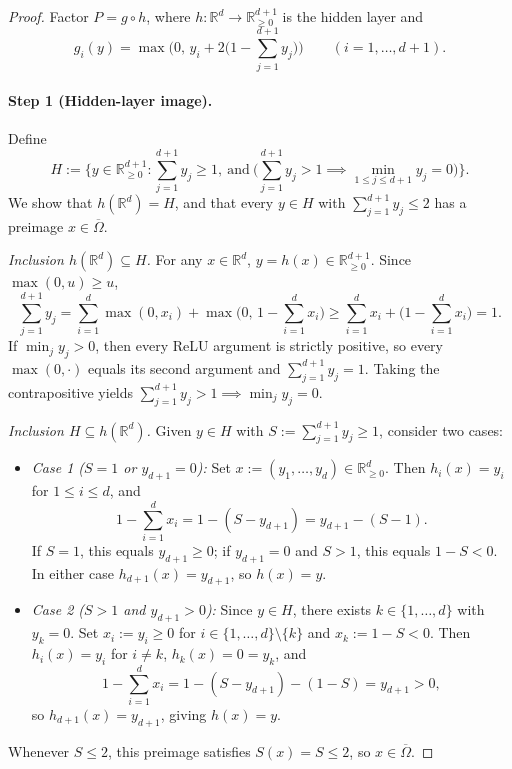 \documentclass[11pt]{article}
\theoremstyle{plain}
\theoremstyle{definition}
\theoremstyle{remark}
\begin{document}
\begin{proof}
Factor $P = g \circ h$, where $h : \mathbb{R}^d \to \mathbb{R}_{\ge 0}^{d+1}$ is the hidden layer and
\[
g_i(y) = \max\biggl(0,\, y_i + 2\biggl(1 - \sum_{j=1}^{d+1} y_j\biggr)\biggr) \qquad (i = 1, \dots, d+1).
\]

\paragraph{Step 1 (Hidden-layer image).}
Define
\[
H := \biggl\{y \in \mathbb{R}_{\ge 0}^{d+1} : \sum_{j=1}^{d+1} y_j \ge 1,\ \text{and}\ \biggl(\sum_{j=1}^{d+1} y_j > 1 \implies \min_{1 \le j \le d+1} y_j = 0\biggr)\biggr\}.
\]
We show that $h(\mathbb{R}^d) = H$, and that every $y \in H$ with $\sum_{j=1}^{d+1} y_j \le 2$ has a preimage $x \in \overline{\Omega}$.

\emph{Inclusion $h(\mathbb{R}^d) \subseteq H$.}
For any $x \in \mathbb{R}^d$, $y = h(x) \in \mathbb{R}_{\ge 0}^{d+1}$. Since $\max(0, u) \ge u$,
\[
\sum_{j=1}^{d+1} y_j = \sum_{i=1}^d \max(0, x_i) + \max\biggl(0,\, 1 - \sum_{i=1}^d x_i\biggr) \ge \sum_{i=1}^d x_i + \biggl(1 - \sum_{i=1}^d x_i\biggr) = 1.
\]
If $\min_j y_j > 0$, then every ReLU argument is strictly positive, so every $\max(0, \cdot)$ equals its second argument and $\sum_{j=1}^{d+1} y_j = 1$. Taking the contrapositive yields $\sum_{j=1}^{d+1} y_j > 1 \implies \min_j y_j = 0$.

\emph{Inclusion $H \subseteq h(\mathbb{R}^d)$.}
Given $y \in H$ with $S := \sum_{j=1}^{d+1} y_j \ge 1$, consider two cases:
\begin{itemize}[leftmargin=2em]
\item \emph{Case 1 ($S = 1$ or $y_{d+1} = 0$):} Set $x := (y_1, \dots, y_d) \in \mathbb{R}_{\ge 0}^d$. Then $h_i(x) = y_i$ for $1 \le i \le d$, and
\[
1 - \sum_{i=1}^d x_i = 1 - (S - y_{d+1}) = y_{d+1} - (S - 1).
\]
If $S = 1$, this equals $y_{d+1} \ge 0$; if $y_{d+1} = 0$ and $S > 1$, this equals $1 - S < 0$. In either case $h_{d+1}(x) = y_{d+1}$, so $h(x) = y$.
\item \emph{Case 2 ($S > 1$ and $y_{d+1} > 0$):} Since $y \in H$, there exists $k \in \{1, \dots, d\}$ with $y_k = 0$. Set $x_i := y_i \ge 0$ for $i \in \{1, \dots, d\} \setminus \{k\}$ and $x_k := 1 - S < 0$. Then $h_i(x) = y_i$ for $i \neq k$, $h_k(x) = 0 = y_k$, and
\[
1 - \sum_{i=1}^d x_i = 1 - (S - y_{d+1}) - (1 - S) = y_{d+1} > 0,
\]
so $h_{d+1}(x) = y_{d+1}$, giving $h(x) = y$.
\end{itemize}
Whenever $S \le 2$, this preimage satisfies $S(x) = S \le 2$, so $x \in \overline{\Omega}$.


\end{proof}
\end{document}
